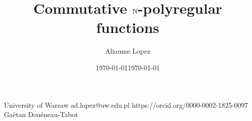 \date{\today}

\title{Commutative $\mathbb{N}$-polyregular functions}

\author{Aliaume Lopez}%
       {University of Warsaw}%
       {ad.lopez@uw.edu.pl}%
       {https://orcid.org/0000-0002-1825-0097}%
       {Gaëtan Douéneau-Tabot}


\date{\today}


\category{} %
\relatedversion{} %


\newcommand{\acknowledge}{
    Acknowledge Gaëtan
}

\newcommand{\makeabstract}{
    \begin{abstract}
        This paper answers two questions about 
        commutative unary output polyregular functions, called
        $\Nat$-polyregular functions, that forms a proper subset
        of $\Nat$-rational series.
        We show that given a $\Rel$-rational series,
        it is decidable whether it is computable via a commutative
        $\Nat$-polyregular function, and provide a counter-example
        to the theorem of Karhumäki that studied the same question
        in the case of polynomials.

        We also prove that it is decidable whether a commutative $\Nat$-polyregular
        function is star-free, by proving the stronger statement
        that star-free $\Rel$-polyregular functions that are
        $\Nat$-polyregular are computable using a star-free $\Nat$-polyregular function.
        This answers positively to previous conjectures on $\Nat$-polyregular functions,
        and the study of the commutative case seems to be useful
        towards a proof in the non-commutative case.
    \end{abstract}
}

\EventLogo{}
